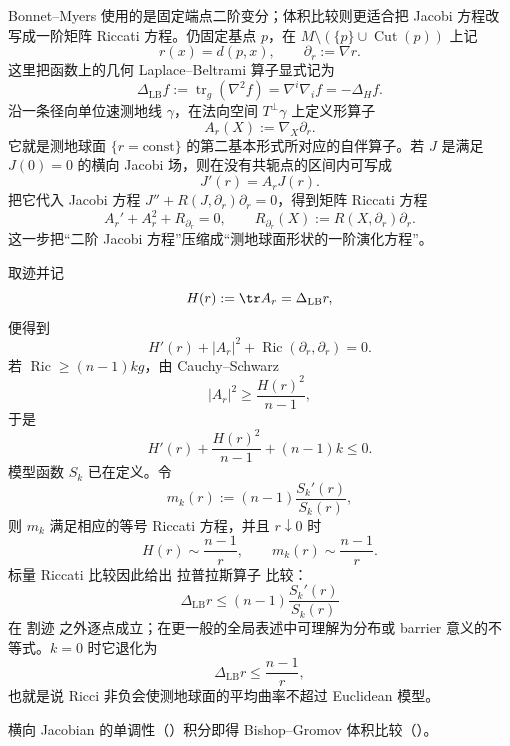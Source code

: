 Bonnet--Myers 使用的是固定端点二阶变分；体积比较则更适合把 Jacobi 方程改写成一阶矩阵 Riccati 方程。仍固定基点 $p$，在 $M\setminus(\{p\}\cup\operatorname{Cut}(p))$ 上记
\[
r(x)=d(p,x),
\qquad
\partial_r:=\nabla r.
\]
这里把函数上的几何 Laplace--Beltrami 算子显式记为
\begin{equation*}\Delta_{\mathrm{LB}}f:=\operatorname{tr}_g(\nabla^2f)=\nabla^i\nabla_i f
=-\Delta_H f.\end{equation*}
沿一条径向单位速测地线 $\gamma$，在法向空间 $T^\perp\gamma$ 上定义形算子
\begin{equation*}A_r(X):=\nabla_X\partial_r.\end{equation*}
它就是测地球面 $\{r=\text{const}\}$ 的第二基本形式所对应的自伴算子。若 $J$ 是满足 $J(0)=0$ 的横向 Jacobi 场，则在没有共轭点的区间内可写成
\[
J'(r)=A_rJ(r).
\]
把它代入 Jacobi 方程 $J''+R(J,\partial_r)\partial_r=0$，得到矩阵 Riccati 方程
\begin{equation*}\boxed{
A_r'+A_r^2+R_{\partial_r}=0,
\qquad
R_{\partial_r}(X):=R(X,\partial_r)\partial_r.}\end{equation*}
这一步把“二阶 Jacobi 方程”压缩成“测地球面形状的一阶演化方程”。

取迹并记
\[
H(r):=\tr A_r=\Delta_{\mathrm{LB}} r,
\]
便得到
\begin{equation*}H'(r)+|A_r|^2+\operatorname{Ric}(\partial_r,\partial_r)=0.\end{equation*}
若 $\operatorname{Ric}\ge(n-1)k g$，由 Cauchy--Schwarz
\[
|A_r|^2\ge\frac{H(r)^2}{n-1},
\]
于是
\begin{equation*}H'(r)+\frac{H(r)^2}{n-1}+(n-1)k\le0.\end{equation*}
模型函数 $S_k$ 已在定义。令
\[
m_k(r):=(n-1)\frac{S_k'(r)}{S_k(r)},
\]
则 $m_k$ 满足相应的等号 Riccati 方程，并且 $r\downarrow0$ 时
\[
H(r)\sim\frac{n-1}{r},
\qquad
m_k(r)\sim\frac{n-1}{r}.
\]
标量 Riccati 比较因此给出 拉普拉斯算子 比较：
\begin{equation}
\boxed{
\Delta_{\mathrm{LB}} r\le(n-1)\frac{S_k'(r)}{S_k(r)}
}
\label{eq:math-dg-laplacian-comparison}
\end{equation}
在 割迹 之外逐点成立；在更一般的全局表述中可理解为分布或 barrier 意义的不等式。$k=0$ 时它退化为
\[
\Delta_{\mathrm{LB}} r\le\frac{n-1}{r},
\]
也就是说 Ricci 非负会使测地球面的平均曲率不超过 Euclidean 模型。

横向 Jacobian 的单调性（）积分即得 Bishop--Gromov 体积比较（）。

